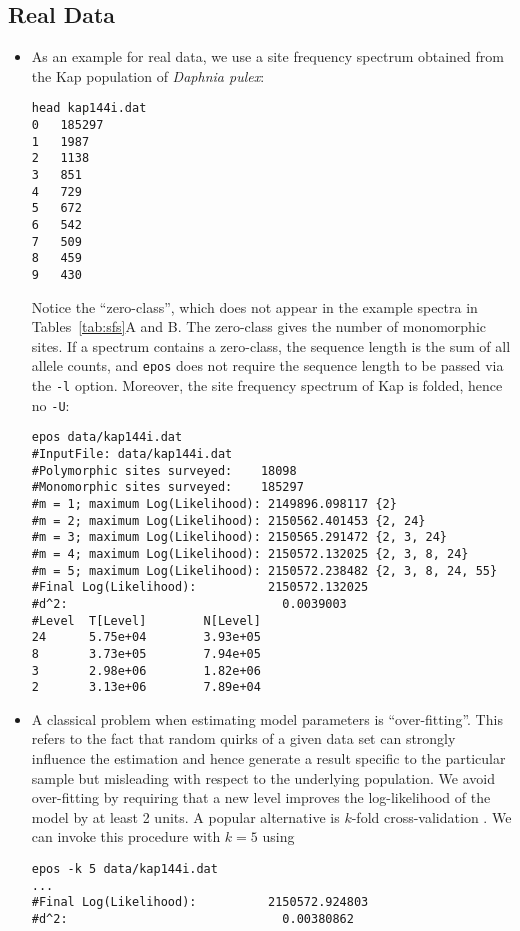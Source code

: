 \documentclass[a4paper, english]{article}
\newcommand{\ty}{\texttt}
\begin{document}
\subsection{Real Data}
\begin{itemize}
\item As an example for real data, we use a site frequency spectrum obtained from
  the Kap population of \textit{Daphnia pulex}:
\begin{verbatim}
head kap144i.dat 
0	185297
1	1987
2	1138
3	851
4	729
5	672
6	542
7	509
8	459
9	430
\end{verbatim}
Notice the ``zero-class'', which does not appear in the example
spectra in Tables~\ref{tab:sfs}A and B. The zero-class gives the
number of monomorphic sites. If a spectrum contains a zero-class, the
sequence length is the sum of all allele counts, and \ty{epos} does not
require the sequence length to be passed via the \ty{-l}
option. Moreover, the site frequency spectrum of Kap is folded, hence
no \ty{-U}:
\begin{verbatim}
epos data/kap144i.dat 
#InputFile:	data/kap144i.dat
#Polymorphic sites surveyed:	18098
#Monomorphic sites surveyed:	185297
#m = 1; maximum Log(Likelihood): 2149896.098117	{2}
#m = 2; maximum Log(Likelihood): 2150562.401453	{2, 24}
#m = 3; maximum Log(Likelihood): 2150565.291472	{2, 3, 24}
#m = 4; maximum Log(Likelihood): 2150572.132025	{2, 3, 8, 24}
#m = 5; maximum Log(Likelihood): 2150572.238482	{2, 3, 8, 24, 55}
#Final Log(Likelihood):          2150572.132025
#d^2:                              0.0039003
#Level  T[Level]        N[Level]
24      5.75e+04        3.93e+05
8       3.73e+05        7.94e+05
3       2.98e+06        1.82e+06
2       3.13e+06        7.89e+04                              
\end{verbatim}
\item A classical problem when estimating model parameters is
  ``over-fitting''. This refers to the fact that random quirks of a
  given data set can strongly influence the estimation and hence
  generate a result specific to the particular sample but misleading
  with respect to the underlying population. We avoid over-fitting by
  requiring that a new level improves the log-likelihood of the model
  by at least 2 units. A popular alternative is $k$-fold
  cross-validation \citep[p. 118f]{goo16:dee}. We can invoke this
  procedure with $k=5$ using
\begin{verbatim}
epos -k 5 data/kap144i.dat 
...
#Final Log(Likelihood):          2150572.924803
#d^2:                              0.00380862

\end{verbatim}
\end{itemize}
\end{document}
